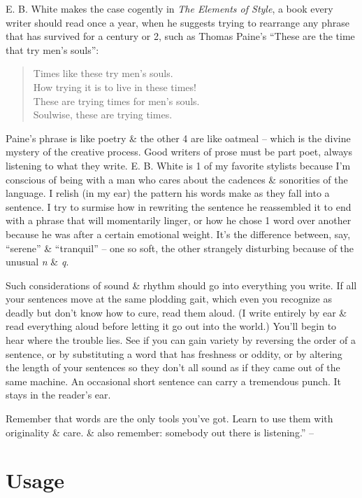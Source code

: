 \documentclass{article}
\begin{document}
E. B. White makes the case cogently in \textit{The Elements of Style}, a book every writer should read once a year, when he suggests trying to rearrange any phrase that has survived for a century or 2, such as Thomas Paine's ``These are the time that try men's souls'':
\begin{quote}
	Times like these try men's souls.\\How trying it is to live in these times!\\These are trying times for men's souls.\\Soulwise, these are trying times.
\end{quote}
Paine's phrase is like poetry \& the other 4 are like oatmeal -- which is the divine mystery of the creative process. Good writers of prose must be part poet, always listening to what they write. E. B. White is 1 of my favorite stylists because I'm conscious of being with a man who cares about the cadences \& sonorities of the language. I relish (in my ear) the pattern his words make as they fall into a sentence. I try to surmise how in rewriting the sentence he reassembled it to end with a phrase that will momentarily linger, or how he chose 1 word over another because he was after a certain emotional weight. It's the difference between, say, ``serene'' \& ``tranquil'' -- one so soft, the other strangely disturbing because of the unusual \textit{n} \& \textit{q}.

Such considerations of sound \& rhythm should go into everything you write. If all your sentences move at the same plodding gait, which even you recognize as deadly but don't know how to cure, read them aloud. (I write entirely by ear \& read everything aloud before letting it go out into the world.) You'll begin to hear where the trouble lies. See if you can gain variety by reversing the order of a sentence, or by substituting a word that has freshness or oddity, or by altering the length of your sentences so they don't all sound as if they came out of the same machine. An occasional short sentence can carry a tremendous punch. It stays in the reader's ear.

Remember that words are the only tools you've got. Learn to use them with originality \& care. \& also remember: somebody out there is listening.'' -- \cite[pp. 37--40]{Zinsser2016}


\section{Usage}
\end{document}
